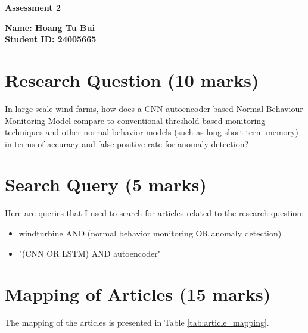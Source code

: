 \documentclass[a4paper,12pt]{article}
\begin{document}
\begin{center}
    \textbf{\Large Assessment 2} \vspace{0.5cm}
\end{center}

\textbf{Name: Hoang Tu Bui} \\
\textbf{Student ID: 24005665} 

\section{ Research Question (10 marks)}
In large-scale wind farms, how does a CNN autoencoder-based Normal Behaviour Monitoring Model compare to conventional threshold-based monitoring techniques and other normal behavior models (such as long short-term memory) in terms of accuracy and false positive rate for anomaly detection?

\section{Search Query (5 marks)}
Here are queries that I used to search for articles related to the research question:
\begin{itemize}
    \item windturbine AND (normal behavior monitoring OR anomaly detection)
    \item "(CNN OR LSTM) AND autoencoder"
\end{itemize}

\section{Mapping of Articles (15 marks)}

The mapping of the articles is presented in Table \ref{tab:article_mapping}.
\end{document}

